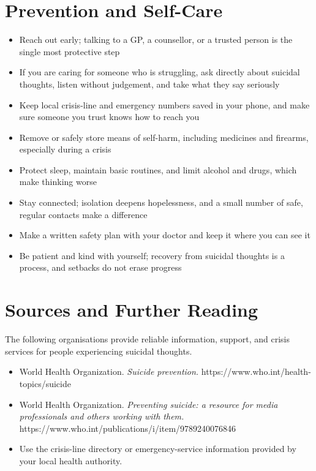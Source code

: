 \section*{Prevention and Self-Care}
\begin{itemize}
    \item Reach out early; talking to a GP, a counsellor, or a trusted person is the single most protective step
    \item If you are caring for someone who is struggling, ask directly about suicidal thoughts, listen without judgement, and take what they say seriously
    \item Keep local crisis-line and emergency numbers saved in your phone, and make sure someone you trust knows how to reach you
    \item Remove or safely store means of self-harm, including medicines and firearms, especially during a crisis
    \item Protect sleep, maintain basic routines, and limit alcohol and drugs, which make thinking worse
    \item Stay connected; isolation deepens hopelessness, and a small number of safe, regular contacts make a difference
    \item Make a written safety plan with your doctor and keep it where you can see it
    \item Be patient and kind with yourself; recovery from suicidal thoughts is a process, and setbacks do not erase progress
\end{itemize}

\section*{Sources and Further Reading}
The following organisations provide reliable information, support, and crisis services for people experiencing suicidal thoughts.

\begin{itemize}
    \item World Health Organization. \textit{Suicide prevention.} https://www.who.int/health-topics/suicide
    \item World Health Organization. \textit{Preventing suicide: a resource for media professionals and others working with them.} https://www.who.int/publications/i/item/9789240076846
    \item Use the crisis-line directory or emergency-service information provided by your local health authority.
\end{itemize}

\clearpage
